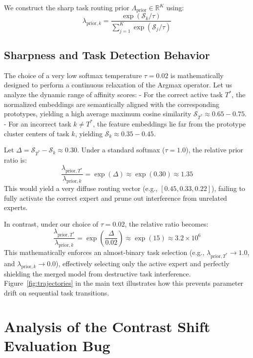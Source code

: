 \documentclass{article}
\theoremstyle{plain}
\theoremstyle{definition}
\theoremstyle{remark}
\begin{document}
We construct the sharp task routing prior $\Lambda_{\text{prior}} \in \mathbb{R}^K$ using:
\begin{equation}
    \lambda_{\text{prior}, k} = \frac{\exp(\mathcal{S}_k / \tau)}{\sum_{j=1}^K \exp(\mathcal{S}_j / \tau)}
\end{equation}

\subsection{Sharpness and Task Detection Behavior}
The choice of a very low softmax temperature $\tau = 0.02$ is mathematically designed to perform a continuous relaxation of the Argmax operator. Let us analyze the dynamic range of affinity scores:
- For the correct active task $T^*$, the normalized embeddings are semantically aligned with the corresponding prototypes, yielding a high average maximum cosine similarity $\mathcal{S}_{T^*} \approx 0.65 - 0.75$.
- For an incorrect task $k \neq T^*$, the feature embeddings lie far from the prototype cluster centers of task $k$, yielding $\mathcal{S}_k \approx 0.35 - 0.45$.

Let $\Delta = \mathcal{S}_{T^*} - \mathcal{S}_k \approx 0.30$. Under a standard softmax ($\tau = 1.0$), the relative prior ratio is:
\begin{equation}
    \frac{\lambda_{\text{prior}, T^*}}{\lambda_{\text{prior}, k}} = \exp(\Delta) \approx \exp(0.30) \approx 1.35
\end{equation}
This would yield a very diffuse routing vector (e.g., $[0.45, 0.33, 0.22]$), failing to fully activate the correct expert and prune out interference from unrelated experts.

In contrast, under our choice of $\tau = 0.02$, the relative ratio becomes:
\begin{equation}
    \frac{\lambda_{\text{prior}, T^*}}{\lambda_{\text{prior}, k}} = \exp\left( \frac{\Delta}{0.02} \right) \approx \exp(15) \approx 3.2 \times 10^6
\end{equation}
This mathematically enforces an almost-binary task selection (e.g., $\lambda_{\text{prior}, T^*} \to 1.0$, and $\lambda_{\text{prior}, k} \to 0.0$), effectively selecting only the active expert and perfectly shielding the merged model from destructive task interference. Figure~\ref{fig:trajectories} in the main text illustrates how this prevents parameter drift on sequential task transitions.

\section{Analysis of the Contrast Shift Evaluation Bug}
\label{appendix-contrast-bug}
\end{document}
